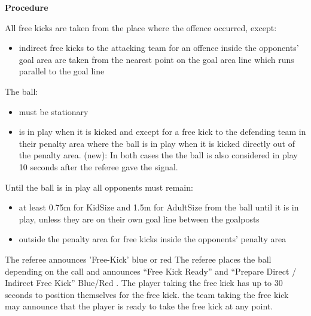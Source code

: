{\bfseries Procedure}

\headlinebox

All free kicks are taken from the place where the offence occurred, except:
\begin{itemize}
\item indirect free kicks to the attacking team for an offence inside the opponents' goal area are taken from the nearest point on the goal area line which runs parallel to the goal line
\end{itemize}

The ball:
\begin{itemize}
\item must be stationary 
\item is in play when it is kicked and   except for a free kick to the defending team in their penalty area
      where the ball is in play when it is kicked directly out of the penalty area.
      (new): In both cases the the ball is also considered in play 10 seconds
      after the referee gave the signal.
\end{itemize}

Until the ball is in play all opponents must remain:
\begin{itemize}
\item at least 0.75m for KidSize and 1.5m for AdultSize
       from the ball until it is in play,
      unless they are on their own goal line between the goalposts 
\item outside the penalty area for free kicks inside the opponents' penalty area
\end{itemize}

The referee announces 'Free-Kick' blue or
red%
The referee places the ball depending on the call and announces
``Free Kick Ready'' and 
``Prepare Direct / Indirect Free Kick'' Blue/Red .
The player taking the free kick has up to 30 seconds to position themselves for
the free kick.
 the team taking the free kick may announce that the player is ready to take the
free kick at any point.

